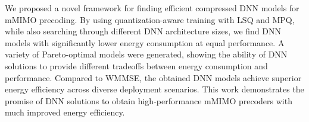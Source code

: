 We proposed a novel framework for finding efficient compressed DNN models for \gls{mMIMO} precoding.
By using quantization-aware training with \gls{LSQ} and \gls{MPQ}, while also searching through different DNN architecture sizes, we find DNN models with significantly lower energy consumption at equal performance. 
A variety of Pareto-optimal models were generated, showing the ability of DNN solutions to provide different tradeoffs between energy consumption and performance.
Compared to \gls{WMMSE}, the obtained DNN models achieve superior energy efficiency across diverse deployment scenarios. This work demonstrates the promise of DNN solutions to obtain high-performance \gls{mMIMO} precoders with much improved energy efficiency.

